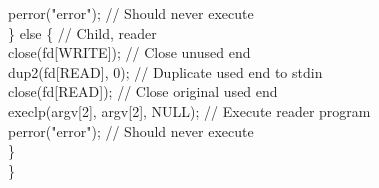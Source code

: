 \begin{flushleft}
\begin{flushleft}
\begin{flushleft}
{      \tab perror("error"); // Should never execute \\
      \halftab \} else \{ // Child, reader \\
      \tab close(fd[WRITE]); // Close unused end \\
      \tab dup2(fd[READ], 0); // Duplicate used end to stdin \\
      \tab close(fd[READ]); // Close original used end\\
      \tab execlp(argv[2], argv[2], NULL); // Execute reader program \\
      \tab perror("error"); // Should never execute \\
      \halftab \}\\
      \}}
    \end{flushleft}
  \end{flushleft}
\end{flushleft}
